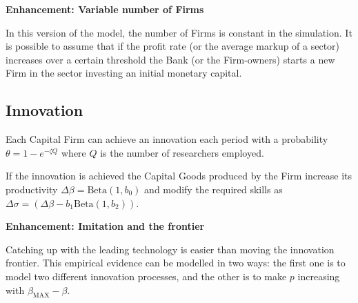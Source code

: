 \documentclass[a4paper, headings=standardclasses]{scrartcl}
\newenvironment{enh}[1][]{\begin{framed}\noindent\textbf{Enhancement: #1}\par}{\end{framed}}
\begin{document}
\begin{enh}[Variable number of Firms]
    In this version of the model, the number of Firms is constant in the simulation. It is possible to assume that if the profit rate (or the average markup of a sector) increases over a certain threshold the Bank (or the Firm-owners) starts a new Firm in the sector investing an initial monetary capital.
\end{enh}

\subsection{Innovation}
Each Capital Firm can achieve an innovation each period with a probability $\theta = 1 - e^{-\zeta Q}$ where $Q$ is the number of researchers employed.

If the innovation is achieved the Capital Goods produced by the Firm increase its productivity $\Delta \beta = \text{Beta}(1, b_0)$ and modify the required skills as $\Delta \sigma = (\Delta \beta - b_1 \text{Beta}(1, b_2))$.

\begin{enh}[Imitation and the frontier]
    Catching up with the leading technology is easier than moving the innovation frontier. This empirical evidence can be modelled in two ways: the first one is to model two different innovation processes, and the other is to make $p$ increasing with $\beta_\text{MAX} - \beta$.
\end{enh}
\end{document}
